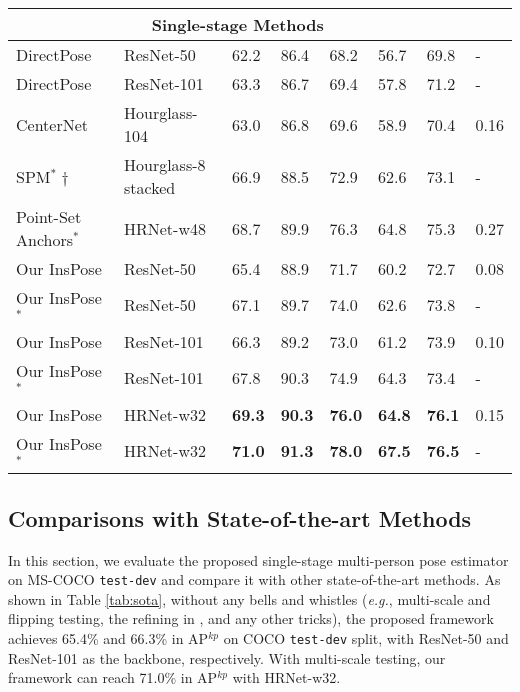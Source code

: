 \documentclass[sigconf]{acmart}
\begin{document}
\begin{table*}[ht]
\begin{tabular}{p{110 pt}<{\centering}p{110 pt}<{\centering}p{30 pt}<{\centering}p{30 pt}<{\centering}p{30 pt}<{\centering}p{30 pt}<{\centering}p{30 pt}<{\centering}p{30 pt}<{\centering}}
    \midrule
    \multicolumn{7}{c}{\textbf{Single-stage Methods}} \\
    \midrule
    DirectPose \cite{tian2019directpose} & ResNet-50 & 62.2 & 86.4 & 68.2 & 56.7 & 69.8 &-\\
DirectPose \cite{tian2019directpose} & ResNet-101 & 63.3 & 86.7 & 69.4 & 57.8 & 71.2 &-\\
CenterNet \cite{zhou2019objects} & Hourglass-104 & 63.0 & 86.8 & 69.6 & 58.9 & 70.4 & 0.16\\
    SPM$^\ast\dag$ \cite{nie2019single} & Hourglass-8 stacked & 66.9 & 88.5 & 72.9 & 62.6 & 73.1 &-\\
    Point-Set Anchors$^\ast$ \cite{wei2020point} & HRNet-w48 & 68.7 & 89.9 & 76.3 & 64.8 & 75.3 & 0.27\\
Our InsPose & ResNet-50 & 65.4 & 88.9 & 71.7 & 60.2 & 72.7 & 0.08\\
    Our InsPose$^\ast$ & ResNet-50 & 67.1 & 89.7 & 74.0 & 62.6 & 73.8 &-\\
    Our InsPose & ResNet-101 & 66.3 & 89.2 & 73.0 & 61.2 & 73.9 & 0.10\\
    Our InsPose$^\ast$ & ResNet-101 & 67.8 & 90.3 & 74.9 & 64.3 & 73.4 &-\\
    Our InsPose & HRNet-w32 & \textbf{69.3} & \textbf{90.3} & \textbf{76.0} & \textbf{64.8} & \textbf{76.1} &  0.15\\
    Our InsPose$^\ast$ &  HRNet-w32 &  \textbf{71.0} &  \textbf{91.3} &  \textbf{78.0} &  \textbf{67.5} & \textbf{76.5} & -\\
\bottomrule
\end{tabular}
\end{table*}


\subsection{Comparisons with State-of-the-art Methods}
In this section, we evaluate the proposed single-stage multi-person pose estimator on MS-COCO \texttt{test-dev} and compare it with other state-of-the-art methods. 
As shown in Table \ref{tab:sota},  without any bells and whistles (\textit{e.g.}, multi-scale and flipping testing, the refining in \cite{cao2017realtime, newell2016associative}, and any other tricks), the proposed framework achieves 65.4\% and 66.3\% in AP$^{kp}$ on COCO \texttt{test-dev} split, with ResNet-50 and ResNet-101 as the backbone, respectively. With multi-scale testing, our framework can reach 71.0\% in AP$^{kp}$ with HRNet-w32.
\end{document}
